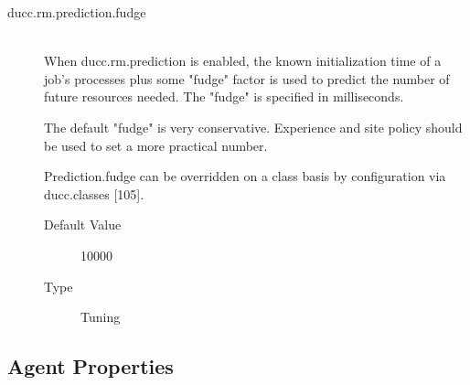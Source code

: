 \begin{description}
        \item[ducc.rm.prediction.fudge] \hfill \\
          When ducc.rm.prediction is enabled, the known initialization time of a job's processes plus 
          some "fudge" factor is used to predict the number of future resources needed. The "fudge" 
          is specified in milliseconds. 
          
          The default "fudge" is very conservative. Experience and site policy should be used to set a 
          more practical number. 

          Prediction.fudge can be overridden on a class basis by configuration via 
          ducc.classes [105]. 

          \begin{description}
          \item[Default Value] 10000 
          \item[Type] Tuning 
          \end{description}
          

        \end{description}
      


\subsection{Agent Properties}


